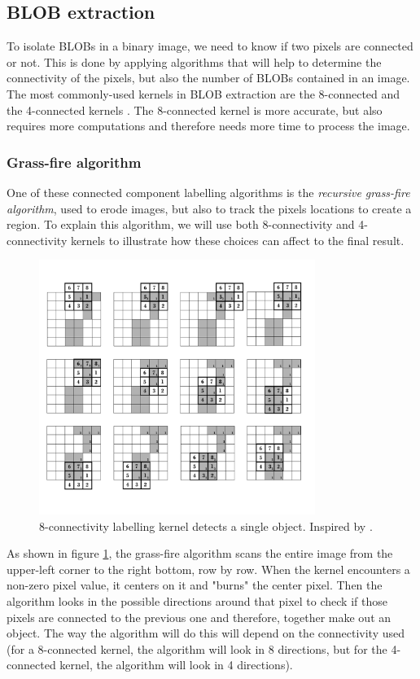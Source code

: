 {\subsection{BLOB extraction}
To isolate BLOBs in a binary image, we need to know if two pixels are connected or not. This is done by applying algorithms that will help to determine the connectivity of the pixels, but also the number of BLOBs contained in an image. The most commonly-used kernels in BLOB extraction are the 8-connected and the 4-connected kernels \citep{ip_book}. The 8-connected kernel is more accurate, but also requires more computations and therefore needs more time to process the image.

\subsubsection{Grass-fire algorithm}
One of these connected component labelling algorithms is the \textit{recursive grass-fire algorithm}, used to erode images, but also to track the pixels locations to create a region.
To explain this algorithm, we will use both 8-connectivity and 4-connectivity kernels to illustrate how these choices can affect to the final result.

\begin{figure}[htbp]
\centering
\includegraphics[width=0.8\textwidth]{Pictures/Theory/8connec_kernel.png}
\caption{8-connectivity labelling kernel detects a single object. Inspired by \citep{ip_book}.}
\label{fig:8connecK}
\end{figure}

As shown in figure \ref{fig:8connecK}, the grass-fire algorithm scans the entire image from the upper-left corner to the right bottom, row by row. When the kernel encounters a non-zero pixel value, it centers on it and "burns" the center pixel. Then the algorithm looks in the possible directions around that pixel to check if those pixels are connected to the previous one and therefore, together make out an object. The way the algorithm will do this will depend on the connectivity used (for a 8-connected kernel, the algorithm will look in 8 directions, but for the 4-connected kernel, the algorithm will look in 4 directions).

}
